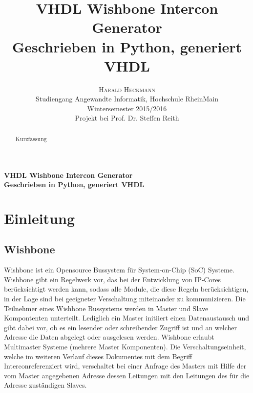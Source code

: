 \documentclass{article}
\title{\vspace{-3mm}%
	\fontsize{24pt}{10pt}\selectfont
	\textbf{VHDL Wishbone Intercon Generator} \\
	\textbf{Geschrieben in Python, generiert VHDL}
	}
\author{%
	\large
	\textsc{Harald Heckmann} \\[2mm]
	\normalsize	Studiengang Angewandte Informatik, Hochschule RheinMain \\
	\normalsize	Wintersemester 2015/2016 \\
	\normalsize	Projekt bei Prof. Dr. Steffen Reith \\
	\vspace{-5mm}
	}
\date{}
\begin{document}

\maketitle
\newpage




\begin{center}
\textbf{VHDL Wishbone Intercon Generator} \\
\textbf{Geschrieben in Python, generiert VHDL}
\end{center}

\begin{abstract}
Kurzfassung
\end{abstract}
\newpage
\tableofcontents
\newpage


\section{Einleitung}
\subsection{Wishbone}
Wishbone ist ein Opensource Bussystem für System-on-Chip (SoC) Systeme.
Wishbone gibt ein Regelwerk vor, das bei der Entwicklung von IP-Cores
berücksichtigt werden kann, sodass alle Module, die diese Regeln berücksichtigen,
in der Lage sind bei geeigneter Verschaltung miteinander zu kommunizieren.
Die Teilnehmer eines Wishbone Bussystems werden in Master und Slave Kompontenten
unterteilt. Lediglich ein Master initiiert einen Datenaustausch und 
gibt dabei vor, ob es ein lesender oder schreibender Zugriff ist und an welcher Adresse
die Daten abgelegt oder ausgelesen werden. Wishbone erlaubt Multimaster Systeme (mehrere Master Komponenten).
Die Verschaltungseinheit, welche im weiteren Verlauf dieses Dokumentes mit dem Begriff \glqq Intercon\grqq referenziert wird, verschaltet bei einer Anfrage des Masters mit Hilfe der vom Master angegebenen Adresse 
dessen Leitungen mit den Leitungen des für die Adresse zuständigen Slaves.
\end{document}
